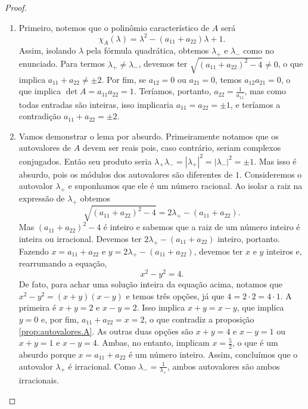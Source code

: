 \begin{proof}
	\begin{enumerate}
	\item Primeiro, notemos que o polinômio característico de $A$ será
	\begin{equation*}
	\chi_A(\lambda) = \lambda^2 -(a_{11}+a_{22})\lambda+1.
	\end{equation*}
Assim, isolando $\lambda$ pela fórmula quadrática, obtemos $\lambda_+$ e $\lambda_-$ como no enunciado. Para termos $\lambda_+ \neq \lambda_-$, devemos ter $\sqrt{(a_{11}+a_{22})^2 - 4} \neq 0$, o que implica $a_{11}+a_{22} \neq \pm 2$. Por fim, se $a_{12} = 0$ ou $a_{21} = 0$, temos $a_{12}a_{21} = 0$, o que implica $\det A = a_{11}a_{22} = 1$. Teríamos, portanto, $a_{22} = \frac{1}{a_{11}}$, mas como todas entradas são inteiras, isso implicaria $a_{11} = a_{22} = \pm 1$, e teríamos a contradição $a_{11} + a_{22} = \pm 2$.

	\item Vamos demonstrar o lema por absurdo. Primeiramente notamos que os autovalores de $A$ devem ser reais pois, caso contrário, seriam complexos conjugados. Então seu produto seria $\lambda_+ \lambda_- = |\lambda_+|^2 = |\lambda_-|^2 = \pm 1$. Mas isso é absurdo, pois os módulos dos autovalores são diferentes de $1$. Consideremos o autovalor $\lambda_{+}$ e suponhamos que ele é um número racional. Ao isolar a raiz na expressão de $\lambda_{+}$ obtemos
	\begin{equation*}
	\sqrt{(a_{11}+a_{22})^2 - 4} = 2\lambda_{+}-(a_{11}+a_{22}).
	\end{equation*}
Mas $(a_{11}+a_{22})^2 - 4$ é inteiro e sabemos que a raiz de um número inteiro é inteira ou irracional. Devemos ter $2\lambda_{+}-(a_{11}+a_{22})$ inteiro, portanto. Fazendo $x = a_{11}+a_{22}$ e $y = 2\lambda_{+}-(a_{11}+a_{22})$, devemos ter $x$ e $y$ inteiros e, rearrumando a equação,
	\begin{equation*}
	x^2 - y^2 = 4.
	\end{equation*}
De fato, para achar uma solução inteira da equação acima, notamos que $x^2 - y^2 = (x+y)(x-y)$ e temos três opções, já que $4=2 \cdot 2 = 4 \cdot 1$. A primeira é $x+y = 2$ e $x-y = 2$. Isso implica $x+y = x-y$, que implica $y=0$ e, por fim, $a_{11}+a_{22} = x = 2$, o que contradiz a proposição \ref{prop:autovalores.A}. As outras duas opções são $x+y = 4$ e $x-y = 1$ ou $x+y = 1$ e $x-y = 4$. Ambas, no entanto, implicam $x = \frac{5}{2}$, o que é um absurdo porque $x = a_{11}+a_{22}$ é um número inteiro. Assim, concluímos que o autovalor $\lambda_{+}$ é irracional. Como $\lambda_- = \frac{1}{\lambda_+}$, ambos autovalores são ambos irracionais.


\end{enumerate}
\end{proof}
